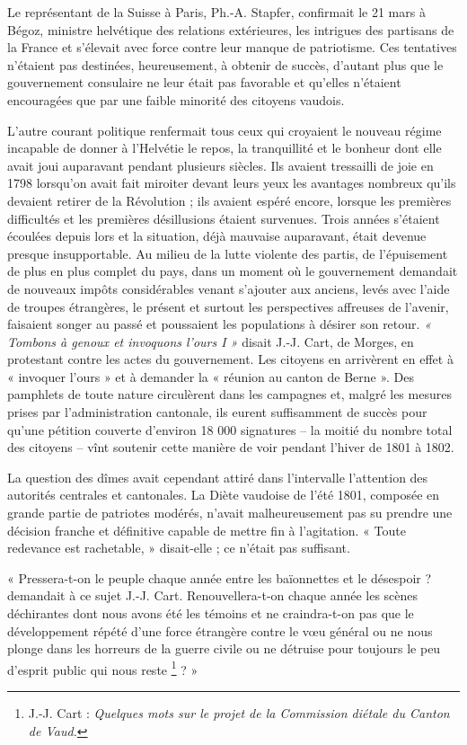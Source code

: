 \documentclass[french,twoside]{book} %
\newenvironment{quoteblock}%
  {\begin{quoting}}
  {\end{quoting}}
\newenvironment{quotebar}{%
    \def\FrameCommand{{\color{rubric!10!}\vrule width 0.5em} \hspace{0.9em}}%
    \def\OuterFrameSep{\itemsep} %
    \MakeFramed {\advance\hsize-\width \FrameRestore}
  }%
  {%
    \endMakeFramed
  }
\renewenvironment{quoteblock}%
  {%
    \savenotes
    \setstretch{0.9}
    \begin{quotebar}
  }
  {%
    \end{quotebar}
    \spewnotes
  }
\begin{document}
\noindent Le représentant de la Suisse à Paris, Ph.-A. Stapfer, confirmait le 21 mars à Bégoz, ministre helvétique des relations extérieures, les intrigues des partisans de la France et s’élevait avec force contre leur manque de patriotisme. Ces tentatives n’étaient pas destinées, heureusement, à obtenir de succès, d’autant plus que le gouvernement consulaire ne leur était pas favorable et qu’elles n’étaient encouragées que par une faible minorité des citoyens vaudois.\par
L’autre courant politique renfermait tous ceux qui croyaient le nouveau régime incapable de donner à l’Helvétie le repos, la tranquillité et le bonheur dont elle avait joui auparavant pendant plusieurs siècles. Ils avaient tressailli de joie en 1798 lorsqu’on avait fait miroiter devant leurs yeux les avantages nombreux qu’ils devaient retirer de la Révolution ; ils avaient espéré encore, lorsque les premières difficultés et les premières désillusions étaient survenues. Trois années s’étaient écoulées depuis lors et la situation, déjà mauvaise auparavant, était devenue presque insupportable. Au milieu de la lutte violente des partis, de l’épuisement de plus en plus complet du pays, dans un moment où le gouvernement demandait de nouveaux impôts considérables venant s’ajouter aux anciens, levés avec l’aide de troupes étrangères, le présent et surtout les perspectives affreuses de l’avenir, faisaient songer au passé et poussaient les populations à désirer son retour. \emph{« Tombons à genoux et invoquons l’ours I »} disait J.-J. Cart, de Morges, en protestant contre les actes du gouvernement. Les citoyens en arrivèrent en effet à « invoquer l’ours » et à demander la « réunion au canton de Berne ». Des pamphlets de toute nature circulèrent dans les campagnes et, malgré les mesures prises par l’administration cantonale, ils eurent suffisamment de succès pour qu’une pétition couverte d’environ 18 000 signatures – la moitié du nombre total des citoyens – vînt soutenir cette manière de voir pendant l’hiver de 1801 à 1802.\par
La question des dîmes avait cependant attiré dans l’intervalle l’attention des autorités centrales et cantonales. La Diète vaudoise de l’été 1801, composée en grande partie de patriotes modérés, n’avait malheureusement pas su prendre une décision franche et définitive capable de mettre fin à l’agitation. « Toute redevance est rachetable, » disait-elle ; ce n’était pas suffisant.\par

\begin{quoteblock}
 \noindent « Pressera-t-on le peuple chaque année entre les baïonnettes et le désespoir ? demandait à ce sujet J.-J. Cart. Renouvellera-t-on chaque année les scènes déchirantes dont nous avons été les témoins et ne craindra-t-on pas que le développement répété d’une force étrangère contre le vœu général ou ne nous plonge dans les horreurs de la guerre civile ou ne détruise pour toujours le peu d’esprit public qui nous reste \footnote{J.-J. Cart : \emph{Quelques mots sur le projet de la Commission diétale du Canton de Vaud.}} ? »
 \end{quoteblock}
\end{document}
